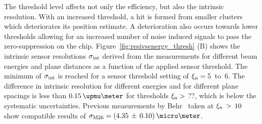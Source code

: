 The threshold level affects not only the efficiency, but also the intrinsic resolution. 
With an increased threshold, a hit is formed from smaller clusters which deteriorates its position estimate. 
A deterioration also occurs towards lower thresholds allowing for an increased number of noise induced signals to pass the zero-suppression on the chip.
Figure~\ref{fig:resivsenergy_thresh} (B) shows the intrinsic sensor resolutions $\sigma_{\textrm{int}}$ derived from the measurements for different beam energies and plane distances as a function of the applied sensor threshold.
The minimum of $\sigma_{\textrm{int}}$ is reached for a sensor threshold setting of $\xi_{\textrm{n}} = 5$~to~6.
The difference in intrinsic resolution for different energies and for different plane spacings is less than $0.15\,\upmu\meter$ for thresholds $\xi_{\textrm{n}} > $ ??, which is below the systematic uncertainties. 
Previous measurements by Behr~\cite{ref:j.behrmeasurements} taken at $\xi_{\textrm{n}}\,>\,10$ show compatible results of $\sigma_{\textrm{M26}} = (4.35\,\pm\,0.10)\,\micro\meter$. %






